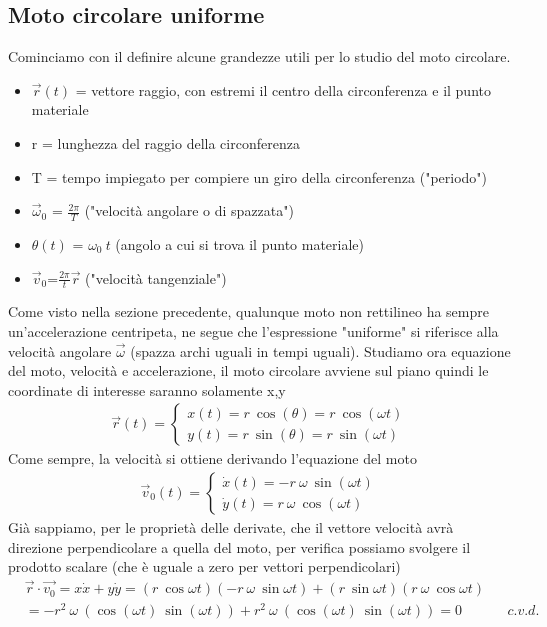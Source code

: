 \documentclass[10pt,a4paper]{article}
\begin{document}
\subsection{Moto circolare uniforme}
Cominciamo con il definire alcune grandezze utili per lo studio del moto circolare.
\begin{itemize}
\item $\vec{r}(t)$ = vettore raggio, con estremi il centro della circonferenza e il punto materiale
\item r = lunghezza del raggio della circonferenza
\item T = tempo impiegato per compiere un giro della circonferenza ("periodo")
\item $\vec{\omega}_0$ = $\frac{2\pi}{T}$   ("velocità angolare o di spazzata")
\item $\theta(t)$ = $\omega_0\ t$ (angolo a cui si trova il punto materiale)
\item $\vec{v}_0$=$\frac{2\pi}{t} \vec{r}$ ("velocità tangenziale")
\end{itemize}
Come visto nella sezione precedente, qualunque moto non rettilineo ha sempre un'accelerazione centripeta, ne segue che l'espressione "uniforme" si riferisce alla velocità angolare $\vec{\omega}$ (spazza archi uguali in tempi uguali). Studiamo ora equazione del moto, velocità e accelerazione, il moto circolare avviene sul piano quindi le coordinate di interesse saranno solamente x,y
\begin{align*}
\vec{r}(t)=
\begin{cases}
x(t)= r\ \cos (\theta) = r\ \cos (\omega t)\\
y(t)= r\ \sin (\theta) = r\ \sin (\omega t)
\end{cases} 
\end{align*}
Come sempre, la velocità si ottiene derivando l'equazione del moto
\begin{align*}
	\vec{v}_0(t)=
	\begin{cases}
		\dot{x}(t)= -r\ \omega\ \sin (\omega t)\\
		\dot{y}(t)= r\ \omega\ \cos (\omega t)
	\end{cases} 
\end{align*}
Già sappiamo, per le proprietà delle derivate, che il vettore velocità avrà direzione perpendicolare a quella del moto, per verifica possiamo svolgere il prodotto scalare (che è uguale a zero per vettori perpendicolari)
\begin{align*}
	&\vec{r} \cdot \vec{v_0} = x \dot{x} + y \dot{y} = (r\ \cos \omega t) (-r\ \omega\ \sin \omega t) + (r\ \sin \omega t) (r\ \omega\ \cos \omega t)\\
	&= -r^2\ \omega\ (\cos (\omega t)\ \sin( \omega t)) + r^2\ \omega\ (\cos (\omega t)\ \sin( \omega t)) = 0 &&c.v.d.
\end{align*}
\end{document}
